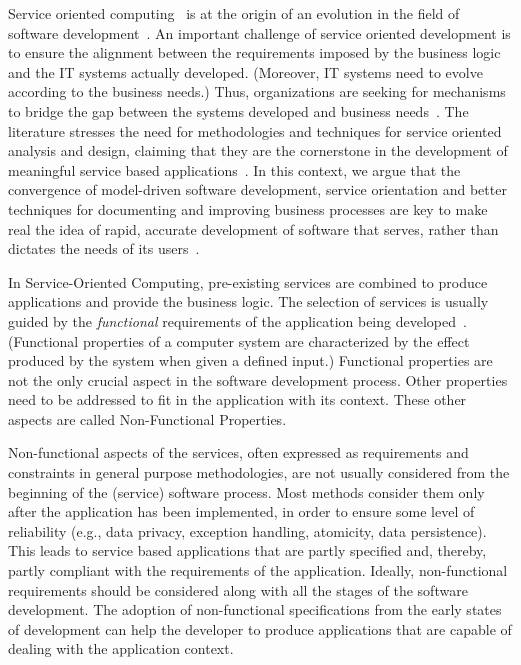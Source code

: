 Service oriented computing~\cite{Papazoglou2007} is at the origin of an evolution in the field of software development~\cite{??}. 
An important challenge of service oriented development is  to ensure the alignment between the requirements imposed by the business logic and the IT systems actually developed.
(Moreover, IT systems need to evolve according to the business needs.)
Thus, organizations are seeking for mechanisms to bridge the gap between the systems developed and business needs~\cite{bell}. 
The literature stresses the need for methodologies and techniques for service oriented analysis and design, claiming that they are the cornerstone  in the development of meaningful service based applications~\cite{5}.  
In this context, we argue that the convergence of model-driven software development, service orientation and better techniques for documenting and improving business processes are key to make real the idea of rapid, accurate development of software that serves, rather than dictates the needs of its users~\cite{watson}. 

In Service-Oriented Computing, pre-existing services are
combined to produce applications and provide the business logic. 
The selection of services is usually guided by the \textit{functional} requirements of the application being developed~\cite{1,2,decastro1,PapazoglouH06}. 
(Functional properties of a computer system are characterized by the effect produced by the system when given a defined input.)
Functional properties are not the only crucial aspect in the software development process. 
Other properties need to be addressed to fit in the application with its context.
These other aspects are called Non-Functional Properties.

Non-functional aspects of the services, often expressed as requirements and constraints in general purpose methodologies, are not usually considered from the beginning of the (service) software process.
Most methods consider them only after the application has been implemented, in order to ensure some level of reliability (e.g., data privacy, exception handling, atomicity, data persistence). 
This leads to service based applications that are partly specified and, thereby, partly compliant with the requirements of the application.
Ideally, non-functional requirements should be considered along with all the stages of the software development. 
The adoption of non-functional specifications from the early states of development
can help the developer to produce applications that are capable of dealing with
the application context.

